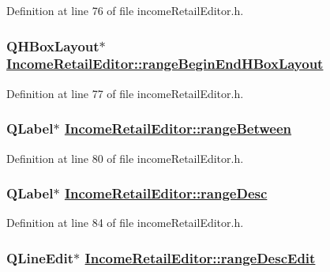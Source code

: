 Definition at line 76 of file income\-Retail\-Editor.h.\hypertarget{classIncomeRetailEditor_r20}{
\subsubsection[rangeBeginEndHBoxLayout]{\setlength{\rightskip}{0pt plus 5cm}QHBox\-Layout$\ast$ \hyperlink{classIncomeRetailEditor_r20}{Income\-Retail\-Editor::range\-Begin\-End\-HBox\-Layout}}}
\label{classIncomeRetailEditor_r20}


Definition at line 77 of file income\-Retail\-Editor.h.\hypertarget{classIncomeRetailEditor_r23}{
\subsubsection[rangeBetween]{\setlength{\rightskip}{0pt plus 5cm}QLabel$\ast$ \hyperlink{classIncomeRetailEditor_r23}{Income\-Retail\-Editor::range\-Between}}}
\label{classIncomeRetailEditor_r23}


Definition at line 80 of file income\-Retail\-Editor.h.\hypertarget{classIncomeRetailEditor_r27}{
\subsubsection[rangeDesc]{\setlength{\rightskip}{0pt plus 5cm}QLabel$\ast$ \hyperlink{classIncomeRetailEditor_r27}{Income\-Retail\-Editor::range\-Desc}}}
\label{classIncomeRetailEditor_r27}


Definition at line 84 of file income\-Retail\-Editor.h.\hypertarget{classIncomeRetailEditor_r28}{
\subsubsection[rangeDescEdit]{\setlength{\rightskip}{0pt plus 5cm}QLine\-Edit$\ast$ \hyperlink{classIncomeRetailEditor_r28}{Income\-Retail\-Editor::range\-Desc\-Edit}}}
\label{classIncomeRetailEditor_r28}


